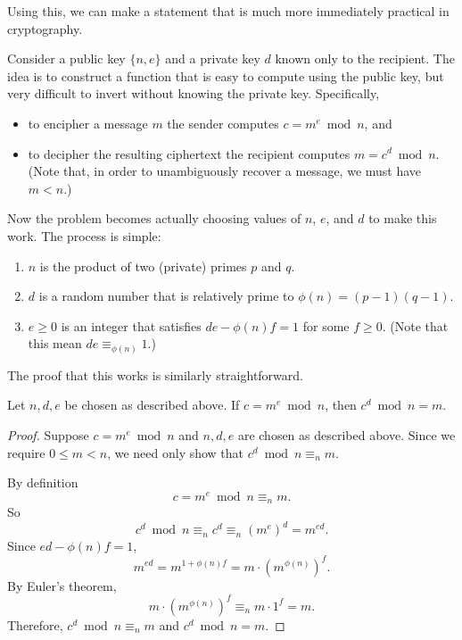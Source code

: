 \documentclass[../m55main.tex]{chapters}
\begin{document}
Using this, we can make a statement that is much more immediately practical in cryptography.

Consider a public key $\{ n, e \}$ and a private key $d$ known only to the recipient.
The idea is to construct a function that is easy to compute using the public key, but very difficult to invert without knowing the private key.
Specifically,
\begin{itemize}
    \item to encipher a message $m$ the sender computes $c = m^e \bmod n$, and
    \item to decipher the resulting ciphertext the recipient computes $m = c^d \bmod n$.
    (Note that, in order to unambiguously recover a message, we must have $m < n$.)
\end{itemize}
Now the problem becomes actually choosing values of $n$, $e$, and $d$ to make this work.
The process is simple:
\begin{enumerate}
    \item $n$ is the product of two (private) primes $p$ and $q$.
    \item $d$ is a random number that is relatively prime to $\phi (n) = (p-1)(q-1)$.
    \item $e \geq 0$ is an integer that satisfies $de - \phi (n) f = 1$ for some $f \geq 0$.
    (Note that this mean $de \equiv_{\phi (n)} 1$.)
\end{enumerate}
The proof that this works is similarly straightforward.

\begin{theorem}
    Let $n,d,e$ be chosen as described above.
    If $c = m^e \bmod n$, then $c^d \bmod n = m$.
\end{theorem}

\begin{proof}
    Suppose $c = m^e \bmod n$ and $n,d,e$ are chosen as described above.
    Since we require $0 \leq m < n$, we need only show that $c^d \bmod n \equiv_n m$.

    By definition
    \[ c = m^e \bmod n \equiv_n m. \]
    So
    \[ c^d \bmod n \equiv_n c^d \equiv_n \left( m^e \right)^d = m^{ed}. \]
    Since $ed - \phi (n) f = 1$,
    \[ m^{ed} = m^{1 + \phi(n) f} = m \cdot \left( m^{\phi (n)} \right)^f. \]
    By Euler's theorem,
    \[ m \cdot \left( m^{\phi (n)} \right)^f \equiv_n m \cdot 1^f = m. \]
    Therefore, $c^d \bmod n \equiv_n m$ and $c^d \bmod n = m$.
\end{proof}
\end{document}
